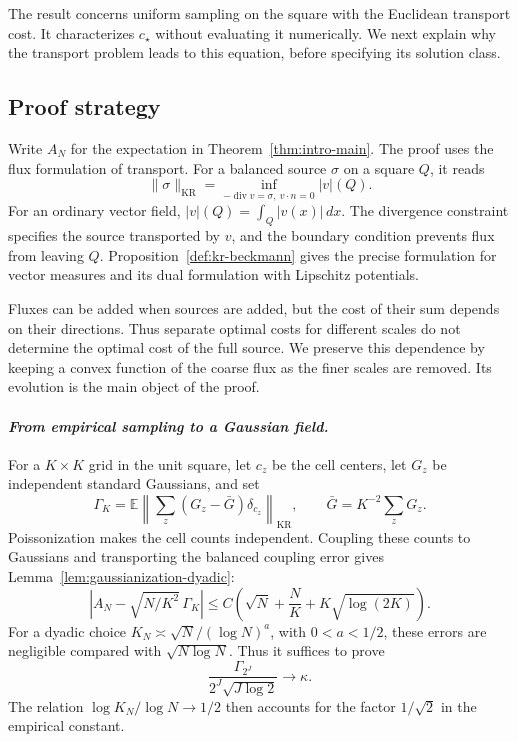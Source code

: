 \documentclass{smfart}
\theoremstyle{definition}
\newcommand{\1}{\mathbf 1}
\newcommand{\KR}{\mathrm{KR}}
\begin{document}
The result concerns uniform sampling on the square with the Euclidean
transport cost.  It characterizes $c_\star$ without evaluating it
numerically.  We next explain why the transport problem leads to this
equation, before specifying its solution class.

\subsection{Proof strategy}\label{subsec:proof-roadmap}

Write $A_N$ for the expectation in Theorem~\ref{thm:intro-main}.
The proof uses the flux formulation of transport.  For a balanced source
$\sigma$ on a square $Q$, it reads
\[
\|\sigma\|_{\KR}
=\inf_{-\operatorname{div}v=\sigma,\ v\cdot n=0}|v|(Q).
\]
For an ordinary vector field, $|v|(Q)=\int_Q|v(x)|\,dx$.
The divergence constraint specifies the source transported by $v$, and
the boundary condition prevents flux from leaving $Q$.
Proposition~\ref{def:kr-beckmann} gives the precise formulation for vector
measures and its dual formulation with Lipschitz potentials.

Fluxes can be added when sources are added, but the cost of their sum
depends on their directions.  Thus separate optimal costs for different
scales do not determine the optimal cost of the full source.  We preserve
this dependence by keeping a convex function of the coarse flux as the
finer scales are removed.  Its evolution is the main object of the proof.

\smallskip
\paragraph{\textit{From empirical sampling to a Gaussian field.}}
For a $K\times K$ grid in the unit square, let $c_z$ be the cell centers,
let $G_z$ be independent standard Gaussians, and set
\[
\Gamma_K=\mathbb E\left\|
\sum_z(G_z-\bar G)\delta_{c_z}\right\|_{\KR},
\qquad \bar G=K^{-2}\sum_zG_z.
\]
Poissonization makes the cell counts independent.  Coupling these counts
to Gaussians and transporting the balanced coupling error gives
Lemma~\ref{lem:gaussianization-dyadic}:
\[
\left|A_N-\sqrt{N/K^2}\,\Gamma_K\right|
\leq C\left(\sqrt N+\frac NK+K\sqrt{\log(2K)}\right).
\]
For a dyadic choice $K_N\asymp\sqrt N/(\log N)^a$, with $0<a<1/2$,
these errors are negligible compared with $\sqrt{N\log N}$.
Thus it suffices to prove
\begin{equation}
\frac{\Gamma_{2^J}}{2^J\sqrt{J\log2}}\longrightarrow\kappa.
\tag{R}\label{eq:roadmap-gaussian-target}
\end{equation}
The relation $\log K_N/\log N\to1/2$ then accounts for the factor
$1/\sqrt2$ in the empirical constant.
\end{document}
